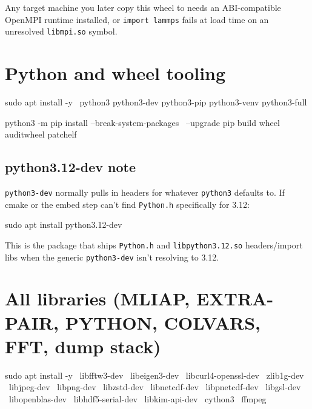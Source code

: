 \documentclass[11pt]{article}
\begin{document}
Any target machine you later copy this wheel to needs an ABI-compatible OpenMPI
runtime installed, or \texttt{import lammps} fails at load time on an unresolved
\texttt{libmpi.so} symbol.

\section{Python and wheel tooling}

\begin{codebox}
sudo apt install -y \
    python3 python3-dev python3-pip python3-venv python3-full

python3 -m pip install --break-system-packages \
    --upgrade pip build wheel auditwheel patchelf
\end{codebox}

\subsection*{python3.12-dev note}

\texttt{python3-dev} normally pulls in headers for whatever \texttt{python3}
defaults to.  If cmake or the embed step can't find \texttt{Python.h}
specifically for 3.12:

\begin{codebox}
sudo apt install python3.12-dev
\end{codebox}

This is the package that ships \texttt{Python.h} and \texttt{libpython3.12.so}
headers/import libs when the generic \texttt{python3-dev} isn't resolving to
3.12.

\section{All libraries (MLIAP, EXTRA-PAIR, PYTHON, COLVARS, FFT, dump stack)}

\begin{codebox}
sudo apt install -y \
    libfftw3-dev \
    libeigen3-dev \
    libcurl4-openssl-dev \
    zlib1g-dev \
    libjpeg-dev \
    libpng-dev \
    libzstd-dev \
    libnetcdf-dev \
    libpnetcdf-dev \
    libgsl-dev \
    libopenblas-dev \
    libhdf5-serial-dev \
    libkim-api-dev \
    cython3 \
    ffmpeg
\end{codebox}
\end{document}
